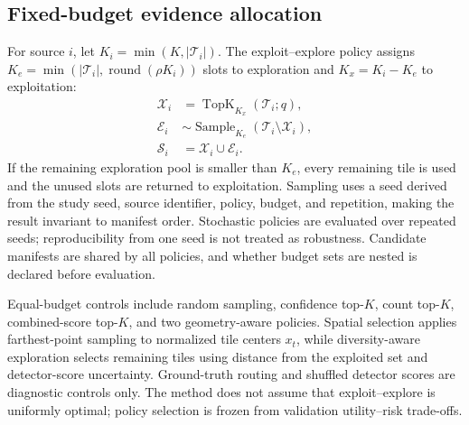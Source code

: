 \subsection{Fixed-budget evidence allocation}
For source $i$, let $K_i=\min(K,|\mathcal{T}_i|)$. The exploit--explore policy assigns $K_e=\min(|\mathcal{T}_i|,\operatorname{round}(\rho K_i))$ slots to exploration and $K_x=K_i-K_e$ to exploitation:
\begin{align}
\mathcal{X}_i &= \operatorname{TopK}_{K_x}(\mathcal{T}_i;q), \\
\mathcal{E}_i &\sim \operatorname{Sample}_{K_e}(\mathcal{T}_i\setminus\mathcal{X}_i), \\
\mathcal{S}_i &= \mathcal{X}_i\cup\mathcal{E}_i.
\label{eq:selector}
\end{align}
If the remaining exploration pool is smaller than $K_e$, every remaining tile is used and the unused slots are returned to exploitation. Sampling uses a seed derived from the study seed, source identifier, policy, budget, and repetition, making the result invariant to manifest order. Stochastic policies are evaluated over repeated seeds; reproducibility from one seed is not treated as robustness. Candidate manifests are shared by all policies, and whether budget sets are nested is declared before evaluation.

Equal-budget controls include random sampling, confidence top-$K$, count top-$K$, combined-score top-$K$, and two geometry-aware policies. Spatial selection applies farthest-point sampling to normalized tile centers $x_t$, while diversity-aware exploration selects remaining tiles using distance from the exploited set and detector-score uncertainty. Ground-truth routing and shuffled detector scores are diagnostic controls only. The method does not assume that exploit--explore is uniformly optimal; policy selection is frozen from validation utility--risk trade-offs.

